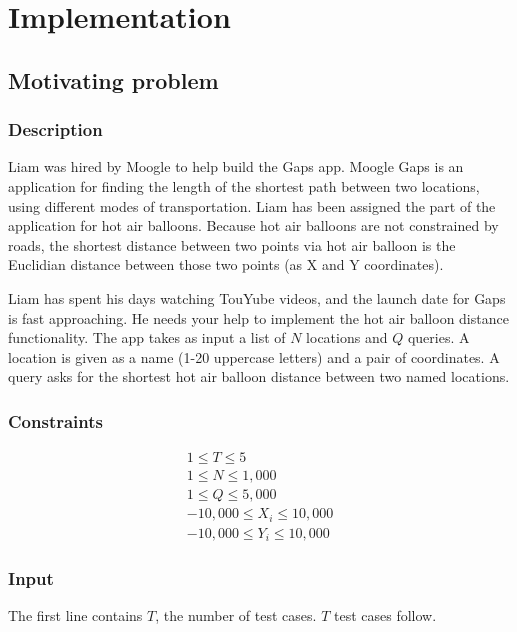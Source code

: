 \section{Implementation}

\subsection*{Motivating problem}

\subsubsection*{Description}

Liam was hired by Moogle to help build the Gaps app. Moogle Gaps is an application for finding the length of the shortest path between two locations, using different modes of transportation. Liam has been assigned the part of the application for hot air balloons. Because hot air balloons are not constrained by roads, the shortest distance between two points via hot air balloon is the Euclidian distance between those two points (as X and Y coordinates).

Liam has spent his days watching TouYube videos, and the launch date for Gaps is fast approaching. He needs your help to implement the hot air balloon distance functionality. The app takes as input a list of $N$ locations and $Q$ queries. A location is given as a name (1-20 uppercase letters) and a pair of coordinates. A query asks for the shortest hot air balloon distance between two named locations.

\subsubsection*{Constraints}

\begin{gather*}
1 \leq T \leq 5 \\
1 \leq N \leq 1,000 \\
1 \leq Q \leq 5,000 \\
-10,000 \leq X_i \leq 10,000 \\
-10,000 \leq Y_i \leq 10,000
\end{gather*}

\subsubsection*{Input}

The first line contains $T$, the number of test cases. $T$ test cases follow.

